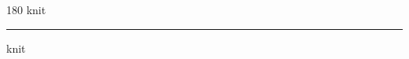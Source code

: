 
\begin{frame}
\begin{center}
\begin{turn}{180}
{\fontsize{2.5cm}{1em}\selectfont knit}
\end{turn}
\vspace{1em}\par  
\hrule
\vspace{1em}\par  
{\fontsize{2.5cm}{1em}\selectfont knit}
\end{center}
\end{frame}
